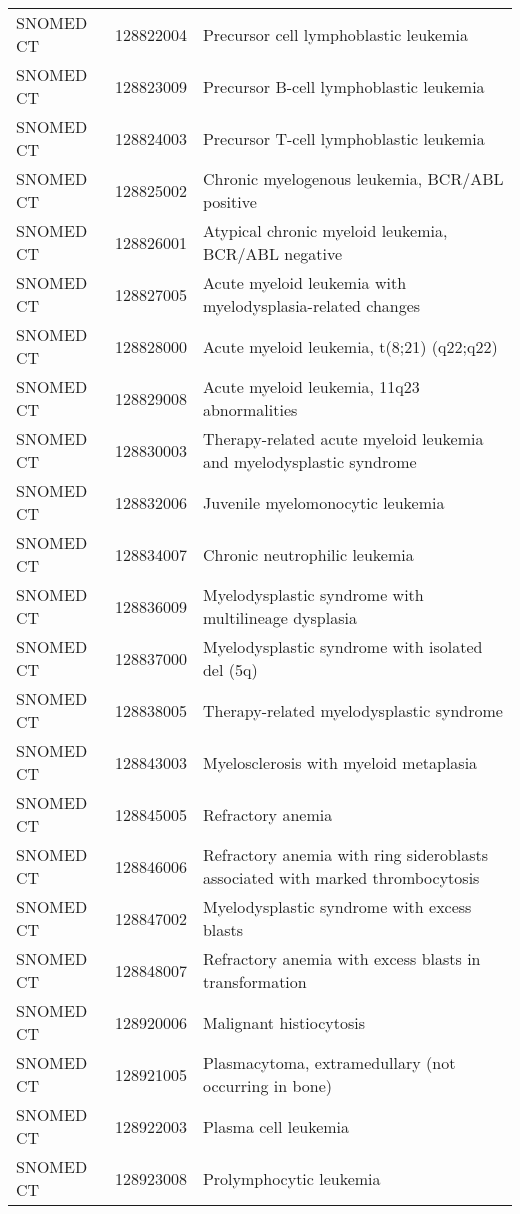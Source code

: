 \begin{table}[ht]
\begin{tabular}{lll}
  SNOMED CT & 128822004 & Precursor cell lymphoblastic leukemia \\ 
  SNOMED CT & 128823009 & Precursor B-cell lymphoblastic leukemia \\ 
  SNOMED CT & 128824003 & Precursor T-cell lymphoblastic leukemia \\ 
  SNOMED CT & 128825002 & Chronic myelogenous leukemia, BCR/ABL positive \\ 
  SNOMED CT & 128826001 & Atypical chronic myeloid leukemia, BCR/ABL negative \\ 
  SNOMED CT & 128827005 & Acute myeloid leukemia with myelodysplasia-related changes \\ 
  SNOMED CT & 128828000 & Acute myeloid leukemia, t(8;21) (q22;q22) \\ 
  SNOMED CT & 128829008 & Acute myeloid leukemia, 11q23 abnormalities \\ 
  SNOMED CT & 128830003 & Therapy-related acute myeloid leukemia and myelodysplastic syndrome \\ 
  SNOMED CT & 128832006 & Juvenile myelomonocytic leukemia \\ 
  SNOMED CT & 128834007 & Chronic neutrophilic leukemia \\ 
  SNOMED CT & 128836009 & Myelodysplastic syndrome with multilineage dysplasia \\ 
  SNOMED CT & 128837000 & Myelodysplastic syndrome with isolated del (5q) \\ 
  SNOMED CT & 128838005 & Therapy-related myelodysplastic syndrome \\ 
  SNOMED CT & 128843003 & Myelosclerosis with myeloid metaplasia \\ 
  SNOMED CT & 128845005 & Refractory anemia \\ 
  SNOMED CT & 128846006 & Refractory anemia with ring sideroblasts associated with marked thrombocytosis \\ 
  SNOMED CT & 128847002 & Myelodysplastic syndrome with excess blasts \\ 
  SNOMED CT & 128848007 & Refractory anemia with excess blasts in transformation \\ 
  SNOMED CT & 128920006 & Malignant histiocytosis \\ 
  SNOMED CT & 128921005 & Plasmacytoma, extramedullary (not occurring in bone) \\ 
  SNOMED CT & 128922003 & Plasma cell leukemia \\ 
  SNOMED CT & 128923008 & Prolymphocytic leukemia \\ 

\end{tabular}
\end{table}
